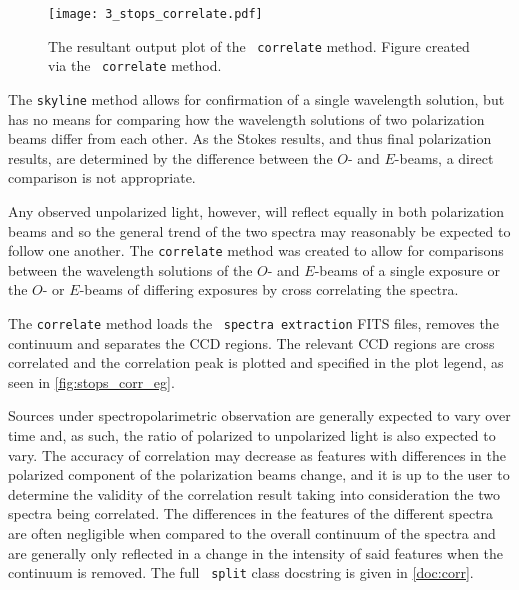 \begin{figure}[t]
    \centering
    \texttt{[image: 3\_stops\_correlate.pdf]}
    \caption{
        The resultant output plot of the \stops\ \texttt{correlate} method.
        Figure created via the \stops\ \texttt{correlate} method.
    }
    \label{fig:stops_corr_eg}
\end{figure}

The \texttt{skyline} method allows for confirmation of a single wavelength solution, but has no means for comparing how the wavelength solutions of two polarization beams differ from each other.
As the Stokes results, and thus final polarization results, are determined by the difference between the $O$- and $E$-beams, a direct comparison is not appropriate.

Any observed unpolarized light, however, will reflect equally in both polarization beams and so the general trend of the two spectra may reasonably be expected to follow one another.
The \texttt{correlate} method was created to allow for comparisons between the wavelength solutions of the $O$- and $E$-beams of a single exposure or the $O$- or $E$-beams of differing exposures by cross correlating the spectra.

The \texttt{correlate} method loads the \polsalt\ \texttt{spectra extraction} \gls{FITS} files, removes the continuum and separates the \gls{CCD} regions.
The relevant \gls{CCD} regions are cross correlated and the correlation peak is plotted and specified in the plot legend, as seen in \autoref{fig:stops_corr_eg}.

Sources under spectropolarimetric observation are generally expected to vary over time and, as such, the ratio of polarized to unpolarized light is also expected to vary.
The accuracy of correlation may decrease as features with differences in the polarized component of the polarization beams change, and it is up to the user to determine the validity of the correlation result taking into consideration the two spectra being correlated.
The differences in the features of the different spectra are often negligible when compared to the overall continuum of the spectra and are generally only reflected in a change in the intensity of said features when the continuum is removed.
The full \stops\ \texttt{split} class docstring is given in \autoref{doc:corr}.



